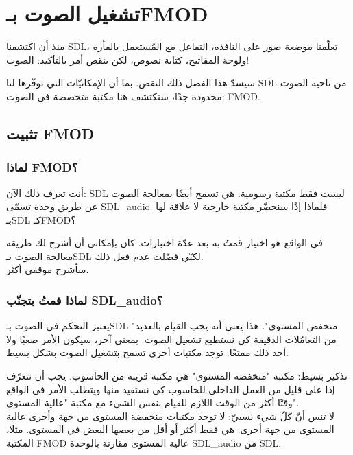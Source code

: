 \chapter{تشغيل الصوت بـ\textenglish{FMOD}}

منذ أن اكتشفنا
\textenglish{SDL}،
تعلّمنا موضعة صور على النافذة، التفاعل مع المُستعمل بالفأرة ولوحة المفاتيح، كتابة نصوص، لكن ينقص أمر بالتأكيد: الصوت!

سيسدّ هذا الفصل ذلك النقص. بما أن الإمكانيّات التي توفّرها لنا
\textenglish{SDL}
من ناحية الصوت محدودة جدًا، سنكتشف هنا مكتبة متخصصة في الصوت:
\textenglish{FMOD}.

\section{تثبيت \textenglish{FMOD}}

\subsection{لماذا \textenglish{FMOD}؟}

أنت تعرف ذلك الآن: \textenglish{SDL}
ليست فقط مكتبة رسومية. هي تسمح أيضًا بمعالجة الصوت عن طريق وحدة تسمّى
\textenglish{SDL\_audio}.
فلماذا إذًا سنحضّر مكتبة خارجية لا علاقة لها بـ\textenglish{SDL}
كـ\textenglish{FMOD}؟

في الواقع هو اختيار قمتُ به بعد عدّة اختبارات. كان بإمكاني أن أشرح لك طريقة معالجة الصوت بـ\textenglish{SDL}
لكنّي فضّلت عدم فعل ذلك.\\
سأشرح موقفي أكثر.

\subsection{لماذا قمتُ بتجنّب \textenglish{SDL\_audio}؟}

يعتبر التحكم في الصوت بـ\textenglish{SDL}
"منخفض المستوى". هذا يعني أنه يجب القيام بالعديد من التعامُلات الدقيقة كي نستطيع تشغيل الصوت. بمعنى آخر، سيكون الأمر صعبًا ولا أجد ذلك ممتعًا. توجد مكتبات أخرى تسمح بتشغيل الصوت بشكل بسيط.

\begin{information}
تذكير بسيط: مكتبة "منخفضة المستوى" هي مكتبة قريبة من الحاسوب. يجب أن نتعرّف إذا على قليل من العمل الداخلي للحاسوب كي نستفيد منها ويتطلب الأمر في الواقع وقتًا أكثر من الوقت اللازم للقيام بنفس الشيء مع مكتبة "عالية المستوى".\\
لا تنس أنّ كلّ شيء نسبيّ: لا توجد مكتبات منخفضة المستوى من جهة وأخرى عالية المستوى من جهة أخرى. هي فقط أكثر أو أقل من بعضها البعض في المستوى. مثلا، المكتبة
\textenglish{FMOD}
عالية المستوى مقارنة بالوحدة
\textenglish{SDL\_audio}
من \textenglish{SDL}.
\end{information}

